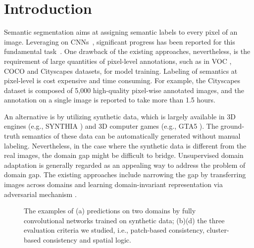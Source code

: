 \documentclass[10pt,twocolumn,letterpaper]{article}
\begin{document}
\section{Introduction}
\vspace{-0.05in}
Semantic segmentation aims at assigning semantic labels to every pixel of an image. Leveraging on CNNs~\cite{he2016deep,Hu_2018_CVPR,ILSVRC15,simonyan2014very,szegedy2015going}, significant progress has been reported for this fundamental task~\cite{chen2016deeplab,Chen_2018_ECCV,long2015fully,Peng_2017_CVPR}. One drawback of the existing approaches, nevertheless, is the requirement of large quantities of pixel-level annotations, such as in VOC \cite{everingham2010pascal}, COCO \cite{lin2014microsoft} and Cityscapes \cite{Cordts2016Cityscapes} datasets, for model training. Labeling of semantics at pixel-level is cost expensive and time consuming.
For example, the Cityscapes dataset is composed of 5,000 high-quality pixel-wise annotated images, and the annotation on a single image is reported to take more than 1.5 hours.

An alternative is by utilizing synthetic data, which is largely available in 3D engines (e.g., SYNTHIA \cite{ros2016synthia}) and 3D computer games (e.g., GTA5 \cite{GTA5_richter2016playing}). The ground-truth semantics of these data can be automatically generated without manual labeling. Nevertheless, in the case where the synthetic data is different from the real images, the domain gap might be difficult to bridge. Unsupervised domain adaptation is generally regarded as an appealing way to address the problem of domain gap. The existing approaches include narrowing the gap by transferring images across domains \cite{dundar2018domain,murez2018image,wu2018dcan} and learning domain-invariant representation via adversarial mechanism \cite{Du_2019_ICCV,luo2019taking,Vu_2019_CVPR}.

\begin{figure*}[!tb]
\vspace{-0.05in}
   \vspace{-0.1in}
   \caption{\small The examples of (a) predictions on two domains by fully convolutional networks trained on synthetic data; (b)(d) the three evaluation criteria we studied, i.e., patch-based consistency, cluster-based consistency and spatial logic.}
   \label{fig:intro}
   \vspace{-0.25in}
\end{figure*}
\end{document}
